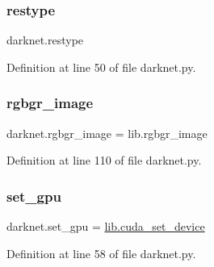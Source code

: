 \subsubsection{\texorpdfstring{restype}{restype}}
{\footnotesize\ttfamily darknet.\+restype}



Definition at line 50 of file darknet.\+py.

\mbox{\label{namespacedarknet_ad1fa5910113bff57cabbe2907cf09904}} 
\subsubsection{\texorpdfstring{rgbgr\_image}{rgbgr\_image}}
{\footnotesize\ttfamily darknet.\+rgbgr\+\_\+image = lib.\+rgbgr\+\_\+image}



Definition at line 110 of file darknet.\+py.

\mbox{\label{namespacedarknet_ac5e2e5729199c2e38ae506e60888324c}} 
\subsubsection{\texorpdfstring{set\_gpu}{set\_gpu}}
{\footnotesize\ttfamily darknet.\+set\+\_\+gpu = \mbox{\hyperlink{cuda_8c_aa4214bec4ec8eda4c37f5e1487efa2e9}{lib.\+cuda\+\_\+set\+\_\+device}}}



Definition at line 58 of file darknet.\+py.

